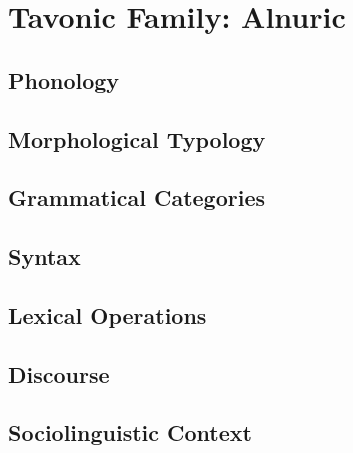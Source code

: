 \documentclass[12pt,letterpaper,openany,twoside]{memoir}
\let\originalpart=\part
\def\part{\cleardoublepage\originalpart}
\begin{document}






\part{Tavonic Family: Alnuric}



\chapter{Phonology}

\chapter{Morphological Typology}

\chapter{Grammatical Categories}

\chapter{Syntax}

\chapter{Lexical Operations}

\chapter{Discourse}

\chapter{Sociolinguistic Context}
\end{document}

